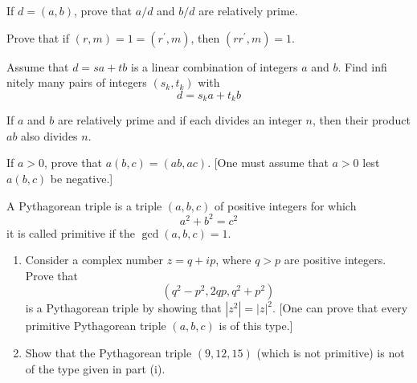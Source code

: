 \begin{questions}
\question
    If \(d=(a, b)\), prove that \(a / d\) and \(b / d\) are relatively prime.


\begin{solution}
    
\end{solution}


\question
    Prove that if \((r, m)=1=\left(r^{\prime}, m\right)\), then \(\left(r r^{\prime}, m\right)=1\).


\begin{solution}
    
\end{solution}


\question
    Assume that \(d=s a+t b\) is a linear combination of integers \(a\) and \(b\). Find infi nitely many pairs of integers \(\left(s_k, t_k\right)\) with
\[
d=s_k a+t_k b
\]


\begin{solution}
    
\end{solution}


\question
    If \(a\) and \(b\) are relatively prime and if each divides an integer \(n\), then their product \(a b\) also divides \(n\).


\begin{solution}
    
\end{solution}


\question
    If \(a>0\), prove that \(a(b, c)=(a b, a c)\). [One must assume that \(a>0\) lest \(a(b, c)\) be negative.]


\begin{solution}
    
\end{solution}


\question
     A Pythagorean triple is a triple \((a, b, c)\) of positive integers for which
\[
a^2+b^2=c^2
\]
it is called primitive if the \(\operatorname{gcd}(a, b, c)=1\).
\begin{enumerate}[label=(\alph*)]
    \item Consider a complex number \(z=q+i p\), where \(q>p\) are positive integers. Prove that
\[
\left(q^2-p^2, 2 q p, q^2+p^2\right)
\]
is a Pythagorean triple by showing that \(\left|z^2\right|=|z|^2\). [One can prove that every primitive Pythagorean triple \((a, b, c)\) is of this type.]
\item Show that the Pythagorean triple \((9,12,15)\) (which is not primitive) is not of the type given in part (i).


\end{enumerate}
\end{questions}
